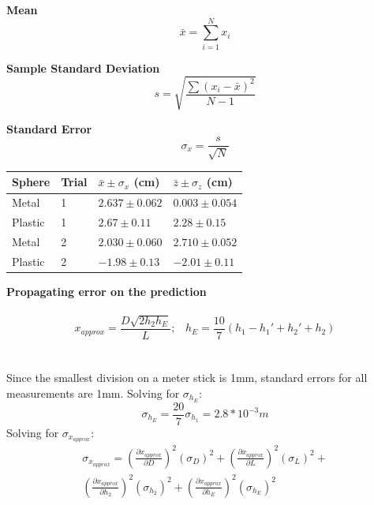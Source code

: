 \documentclass{article}
\begin{document}
\textbf{Mean}
\begin{equation} \label{eq:5}
    \bar{x} = \sum_{i=1}^{N} x_{i}
\end{equation}

\textbf{Sample Standard Deviation}
\begin{equation} \label{eq:6}
    s = \sqrt{\frac{\sum (x_{i} - \bar{x})^2}{N-1}}
\end{equation}

\textbf{Standard Error}
\begin{equation} \label{eq:7}
    \sigma_{x} = \frac{s}{\sqrt{N}}
\end{equation}

\hspace{1cm}

\begin{center}
\begin{tabular} {|l|l|l|l|} 
    \hline
    \bfseries Sphere & \bfseries Trial & \bfseries $\bar{x}\pm\sigma_{x}$ (cm)& \bfseries $\bar{z}\pm\sigma_{z}$ (cm)\\\hline
    Metal&1&$2.637\pm0.062$&$0.003\pm0.054$\\\hline
    Plastic&1&$2.67\pm0.11$&$2.28\pm0.15$\\\hline
    Metal&2&$2.030\pm0.060$&$2.710\pm0.052$\\\hline
    Plastic&2&$-1.98\pm0.13$&$-2.01\pm0.11$\\\hline
\end{tabular}
\end{center}
\textbf{Propagating error on the prediction}
\\\\
\begin{equation}
    x_{approx} = \frac{D\sqrt{2h_{2}h_{E}}}{L}\text{;} \quad h_{E} = \frac{10}{7}(h_{1}-h_{1}\ensuremath{'}+h_{2}\ensuremath{'}+h_{2})
\end{equation}
\\\\
Since the smallest division on a meter stick is 1\si{mm}, standard errors for all measurements are 1\si{mm}. Solving for $\sigma_{h_{E}}$:
\begin{equation}
    \sigma_{h_{E}} = \frac{20}{7}\sigma_{h_{1}} = 2.8 * 10^{-3} \si{m}
\end{equation}
Solving for $\sigma_{x_{approx}}$: 
\begin{multline}
    \sigma_{x_{approx}} = (\frac{\partial x_{approx}}{\partial D})^2 (\sigma_{D})^2+
        (\frac{\partial x_{approx}}{\partial L})^2 (\sigma_{L})^2+\\
        (\frac{\partial x_{approx}}{\partial h_{2}})^2 (\sigma_{h_{2}})^2 +
        (\frac{\partial x_{approx}}{\partial h_{E}})^2 (\sigma_{h_{E}})^2 
\end{multline}
\end{document}
